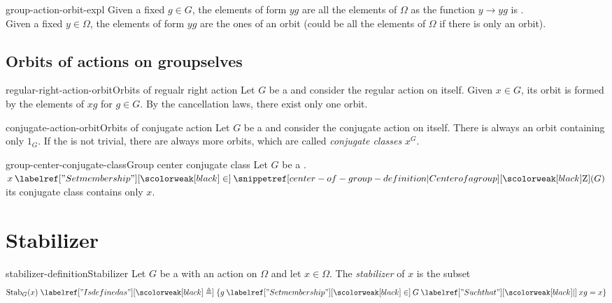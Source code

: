 \documentclass[preview]{standalone}
\begin{document}
\begin{snippet}{group-action-orbit-expl}
    Given a fixed \(g\in G\), the elements of form \(yg\)
    are all the elements of \(\Omega\) as the function \(y \to yg\)
    is \bijective. \\
    Given a fixed \(y\in \Omega\), the elements of form \(yg\)
    are the ones of an orbit (could be all the elements of \(\Omega\) if there is only an orbit).
\end{snippet}

\subsection{Orbits of actions on groupselves}

\begin{snippetproposition}{regular-right-action-orbit}{Orbits of regualr right action}
    Let \(G\) be a \group and consider the regular action on itself.
    Given \(x\in G\), its orbit is formed by the elements of \(xg\) for \(g\in G\).
    By the cancellation laws, there exist only one orbit.
\end{snippetproposition}


\begin{snippetproposition}{conjugate-action-orbit}{Orbits of conjugate action}
    Let \(G\) be a \group and consider the conjugate action on itself.
    There is always an orbit containing only \(1_G\).
    If the \group is not trivial, there are always more orbits,
    which are called \emph{conjugate classes} \(x^G\).
\end{snippetproposition}

\begin{snippetproposition}{group-center-conjugate-class}{Group center conjugate class}
    Let \(G\) be a \group.
    \(x \in \groupcenter(G)\) \ifandonlyif its conjugate class
    contains only \(x\).
\end{snippetproposition}

\section{Stabilizer}

\begin{snippetdefinition}{stabilizer-definition}{Stabilizer}
    Let \(G\) be a \group with an action on \(\Omega\)
    and let \(x\in\Omega\).
    The \emph{stabilizer} of \(x\) is the subset
    \[
        \text{Stab}_G(x) \triangleq \{
            g\in G \suchthat xg = x    
        \}
    \]
\end{snippetdefinition}
\end{document}
